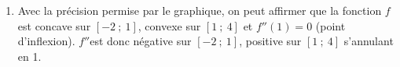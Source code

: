 \documentclass[10pt]{article}
\providecommand{\R}{\mathbb{R}}
\providecommand{\e}{{\mathrm{e}}}
\begin{document}
\begin{enumerate}
	 $\dfrac{1}{2}\e^1+k=1 \iff k=1-\dfrac{1}{2}\e$. Donc $\forall x \in \R$, $F(x)=\dfrac{1}{2}\e^{2x+1}+1-\dfrac{1}{2}\e$. \hfill {}
	 \item Avec la précision permise par le graphique, on peut affirmer que la fonction $f$ est concave sur $[-2~;~1]$, convexe sur $[1~;~4]$ et $f''(1)=0$ (point d'inflexion). $f''$est donc négative sur $[-2~;~1]$, positive sur $[1~;~4]$ s'annulant en 1. \hfill {}
\end{enumerate}

\pagebreak
\end{document}
